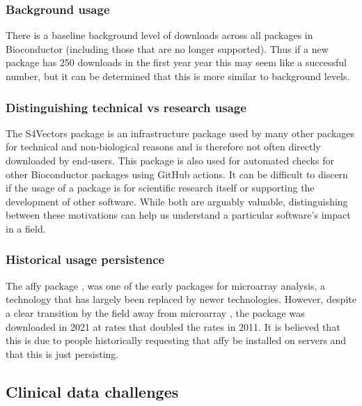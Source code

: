 \documentclass{article}
\begin{document}
\subsubsection{Background usage}
There is a baseline background level of downloads across all packages in Bioconductor (including those that are no longer supported). Thus if a new package has 250 downloads in the first year year this may seem like a successful number, but it can be determined that this is more similar to background levels.

\subsubsection{Distinguishing technical vs research usage}

The S4Vectors package is an infrastructure package used by many other packages for technical and non-biological reasons and is therefore not often directly downloaded by end-users. This package is also used for automated checks for other Bioconductor packages using GitHub actions. It can be difficult to discern if the usage of a package is for scientific research itself or supporting the development of other software. While both are arguably valuable, distinguishing between these motivations can help us understand a particular software's impact in a field.  

\subsubsection{Historical usage persistence}

The affy package \cite{affy}, was one of the early packages for microarray analysis, a technology that has largely been replaced by newer technologies. However, despite a clear transition by the field away from microarray \cite{mantione_comparing_2014}, the package was downloaded in 2021 at rates that doubled the rates in 2011. It is believed that this is due to people historically requesting that affy be installed on servers and that this is just persisting. 




\subsection{Clinical data challenges}
\end{document}
